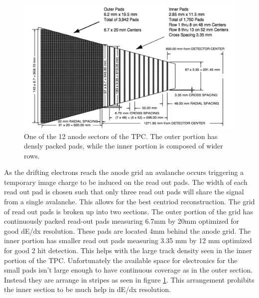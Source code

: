 \documentclass[abstract = on,listof=totoc, bibliography=totoc]{scrreprt}
\begin{document}
\begin{figure}
\begin{center}
\includegraphics[width = 1\textwidth]{tpcPAD}
\caption[Anode sector of STAR TPC]{One of the 12 anode sectors of the TPC. The outer portion has densly packed pads, while the inner portion is composed of wider rows.}
\label{fig:tpcPad}
\end{center}
\end{figure}
As the drifting electrons reach the anode grid an avalanche occurs triggering a temporary image charge to be induced on the read out pads. The width of each read out pad is chosen such that only three read out pads will share the signal from a single avalanche. This allows for the best centriod reconstruction. The grid of read out pads is broken up into two sections. The outer portion of the grid has continuously packed read-out pads measuring 6.7mm by 20mm optimized for good dE/dx resolution. These pads are located 4mm behind the anode grid. The inner portion has smaller read out pads measuring 3.35 mm by 12 mm optimized for good 2 hit detection. This helps with the large track density seen in the inner portion of the TPC. Unfortunately the available space for electronics for the small pads isn't large enough to have continuous coverage as in the outer section. Instead they are arrange in stripes as seen in figure \ref{fig:tpcPad}. This arrangement prohibits the inner section to be much help in dE/dx resolution\cite{TPC}.
\end{document}
